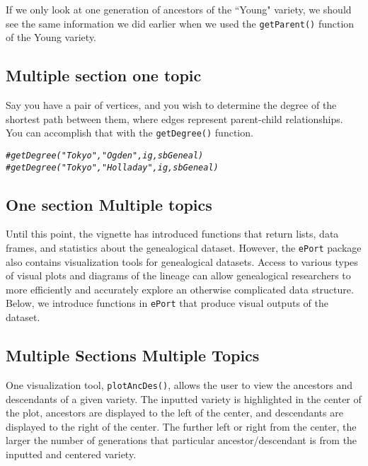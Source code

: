\documentclass{article}\usepackage[]{graphicx}\usepackage[]{color}
\makeatletter
\newcommand{\hlcom}[1]{\textcolor[rgb]{0.678,0.584,0.686}{\textit{#1}}}%
\newenvironment{kframe}{%
 \def\at@end@of@kframe{}%
 \ifinner\ifhmode%
  \def\at@end@of@kframe{\end{minipage}}%
  \begin{minipage}{\columnwidth}%
 \fi\fi%
 \def\FrameCommand##1{\hskip\@totalleftmargin \hskip-\fboxsep
 \colorbox{shadecolor}{##1}\hskip-\fboxsep
     \hskip-\linewidth \hskip-\@totalleftmargin \hskip\columnwidth}%
 \MakeFramed {\advance\hsize-\width
   \@totalleftmargin\z@ \linewidth\hsize
   \@setminipage}}%
 {\par\unskip\endMakeFramed%
 \at@end@of@kframe}
\newenvironment{knitrout}{}{} %
\numberwithin{equation}{section} %
\newcommand{\pkg}[1]{{\texttt{#1}}}
\makeatother
\begin{document}
If we only look at one generation of ancestors of the ``Young" variety, we should see the same information we did earlier when we used the \texttt{getParent()} function of the Young variety.

\subsection{{Multiple section one topic}}

Say you have a pair of vertices, and you wish to determine the degree of the shortest path between them, where edges represent parent-child relationships. You can accomplish that with the \texttt{getDegree()} function.

\begin{knitrout}
\color{fgcolor}\begin{kframe}
\begin{alltt}
\hlcom{#getDegree("Tokyo", "Ogden", ig, sbGeneal)}
\hlcom{#getDegree("Tokyo", "Holladay", ig, sbGeneal)}
\end{alltt}
\end{kframe}
\end{knitrout}

\subsection{One section Multiple topics}

Until this point, the vignette has introduced functions that return lists, data frames, and statistics about the genealogical dataset. However, the \pkg{ePort} package also contains visualization tools for genealogical datasets. Access to various types of visual plots and diagrams of the lineage can allow genealogical researchers to more efficiently and accurately explore an otherwise complicated data structure. Below, we introduce functions in \pkg{ePort} that produce visual outputs of the dataset.

\subsection{Multiple Sections Multiple Topics}

One visualization tool, \texttt{plotAncDes()}, allows the user to view the ancestors and descendants of a given variety. The inputted variety is highlighted in the center of the plot, ancestors are displayed to the left of the center, and descendants are displayed to the right of the center. The further left or right from the center, the larger the number of generations that particular ancestor/descendant is from the inputted and centered variety.
\end{document}
